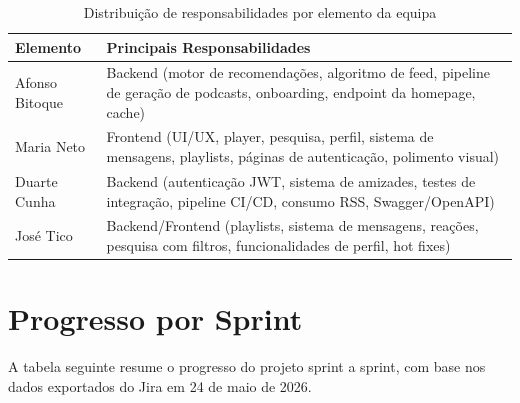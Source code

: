 \documentclass[12pt, a4paper]{report}
\begin{document}
\begin{table}[H]
  \centering
  \begin{tabularx}{\textwidth}{L{4cm} X}
    \toprule
    \textbf{Elemento} & \textbf{Principais Responsabilidades} \\
    \midrule
    Afonso Bitoque       & Backend (motor de recomendações, algoritmo de feed, pipeline de geração de podcasts, onboarding, endpoint da homepage, cache) \\
    Maria Neto           & Frontend (UI/UX, player, pesquisa, perfil, sistema de mensagens, playlists, páginas de autenticação, polimento visual) \\
    Duarte Cunha         & Backend (autenticação JWT, sistema de amizades, testes de integração, pipeline CI/CD, consumo RSS, Swagger/OpenAPI) \\
    José Tico            & Backend/Frontend (playlists, sistema de mensagens, reações, pesquisa com filtros, funcionalidades de perfil, hot fixes) \\
    \bottomrule
  \end{tabularx}
  \caption{Distribuição de responsabilidades por elemento da equipa}
\end{table}

\section{Progresso por Sprint}

A tabela seguinte resume o progresso do projeto sprint a sprint, com base nos
dados exportados do Jira em 24 de maio de 2026.
\end{document}
